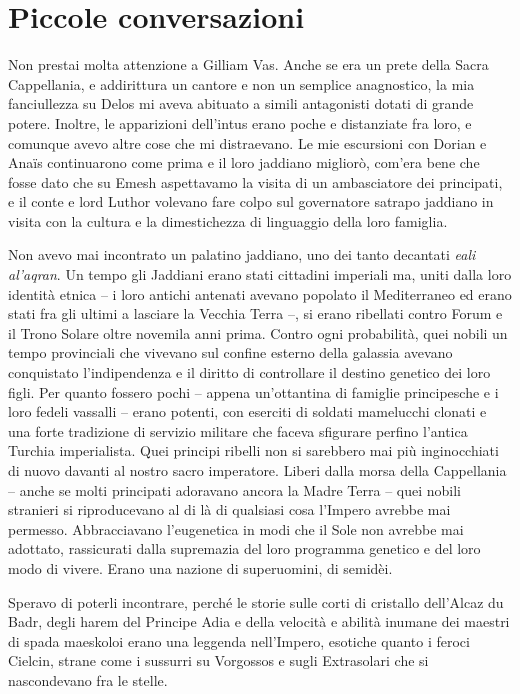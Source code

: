 \chapter{Piccole conversazioni}

Non prestai molta attenzione a Gilliam Vas. Anche se era un prete della
Sacra Cappellania, e addirittura un cantore e non un semplice
anagnostico, la mia fanciullezza su Delos mi aveva abituato a simili
antagonisti dotati di grande potere. Inoltre, le apparizioni dell'intus
erano poche e distanziate fra loro, e comunque avevo altre cose che mi
distraevano. Le mie escursioni con Dorian e Anaïs continuarono come
prima e il loro jaddiano migliorò, com'era bene che fosse dato che su
Emesh aspettavamo la visita di un ambasciatore dei principati, e il
conte e lord Luthor volevano fare colpo sul governatore satrapo jaddiano
in visita con la cultura e la dimestichezza di linguaggio della loro
famiglia.

Non avevo mai incontrato un palatino jaddiano, uno dei tanto decantati
\emph{eali al'aqran}. Un tempo gli Jaddiani erano stati cittadini
imperiali ma, uniti dalla loro identità etnica -- i loro antichi
antenati avevano popolato il Mediterraneo ed erano stati fra gli ultimi
a lasciare la Vecchia Terra --, si erano ribellati contro Forum e il
Trono Solare oltre novemila anni prima. Contro ogni probabilità, quei
nobili un tempo provinciali che vivevano sul confine esterno della
galassia avevano conquistato l'indipendenza e il diritto di controllare
il destino genetico dei loro figli. Per quanto fossero pochi -- appena
un'ottantina di famiglie principesche e i loro fedeli vassalli -- erano
potenti, con eserciti di soldati mamelucchi clonati e una forte
tradizione di servizio militare che faceva sfigurare perfino l'antica
Turchia imperialista. Quei principi ribelli non si sarebbero mai più
inginocchiati di nuovo davanti al nostro sacro imperatore. Liberi dalla
morsa della Cappellania -- anche se molti principati adoravano ancora la
Madre Terra -- quei nobili stranieri si riproducevano al di là di
qualsiasi cosa l'Impero avrebbe mai permesso. Abbracciavano l'eugenetica
in modi che il Sole non avrebbe mai adottato, rassicurati dalla
supremazia del loro programma genetico e del loro modo di vivere. Erano
una nazione di superuomini, di semidèi.

Speravo di poterli incontrare, perché le storie sulle corti di cristallo
dell'Alcaz du Badr, degli harem del Principe Adia e della velocità e
abilità inumane dei maestri di spada maeskoloi erano una leggenda
nell'Impero, esotiche quanto i feroci Cielcin, strane come i sussurri su
Vorgossos e sugli Extrasolari che si nascondevano fra le stelle.

